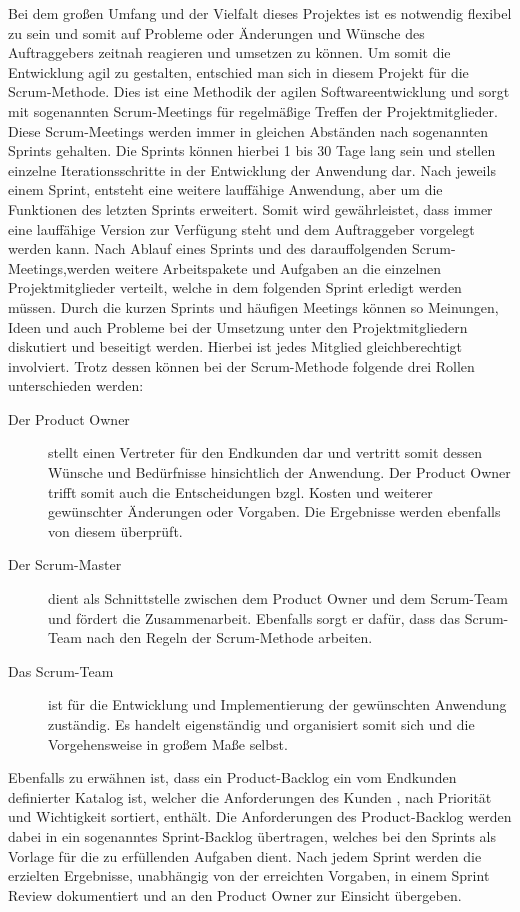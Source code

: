 Bei dem großen Umfang und der Vielfalt dieses Projektes ist es notwendig
flexibel zu sein und somit auf Probleme oder Änderungen und Wünsche des
Auftraggebers zeitnah reagieren und umsetzen zu können. Um somit die
Entwicklung agil zu gestalten, entschied man sich in diesem Projekt für die
Scrum-Methode. Dies ist eine Methodik der agilen Softwareentwicklung und sorgt
mit sogenannten Scrum-Meetings für regelmäßige Treffen der Projektmitglieder.
Diese Scrum-Meetings werden immer in gleichen Abständen nach sogenannten
Sprints gehalten. Die Sprints können hierbei 1 bis 30 Tage lang sein und
stellen einzelne Iterationsschritte in der Entwicklung der Anwendung dar. Nach
jeweils einem Sprint, entsteht eine weitere lauffähige Anwendung, aber um die
Funktionen des letzten Sprints erweitert. Somit wird gewährleistet, dass immer
eine lauffähige Version zur Verfügung steht und dem Auftraggeber vorgelegt
werden kann. Nach Ablauf eines Sprints und des darauffolgenden
Scrum-Meetings,werden weitere Arbeitspakete und Aufgaben an die einzelnen
Projektmitglieder verteilt, welche in dem folgenden Sprint erledigt werden
müssen. Durch die kurzen Sprints und häufigen Meetings können so Meinungen,
Ideen und auch Probleme bei der Umsetzung unter den Projektmitgliedern
diskutiert und beseitigt werden. Hierbei ist jedes Mitglied gleichberechtigt
involviert. Trotz dessen können bei der Scrum-Methode folgende drei Rollen
unterschieden werden:

\begin{description}
\item[Der Product Owner] stellt einen Vertreter für den Endkunden dar und
vertritt somit dessen Wünsche und Bedürfnisse hinsichtlich der Anwendung. Der
Product Owner trifft somit auch die Entscheidungen bzgl. Kosten und weiterer
gewünschter Änderungen oder Vorgaben. Die Ergebnisse werden ebenfalls von
diesem überprüft.
\item[Der Scrum-Master] dient als Schnittstelle zwischen dem Product Owner und
dem Scrum-Team und fördert die Zusammenarbeit. Ebenfalls sorgt er dafür, dass
das Scrum-Team nach den Regeln der Scrum-Methode arbeiten.
\item[Das Scrum-Team] ist für die Entwicklung und Implementierung der
gewünschten Anwendung zuständig. Es handelt eigenständig und organisiert somit
sich und die Vorgehensweise in großem Maße selbst.
\end{description}

Ebenfalls zu erwähnen ist, dass ein Product-Backlog ein vom Endkunden
definierter Katalog ist, welcher die Anforderungen des Kunden , nach Priorität
und Wichtigkeit sortiert, enthält. Die Anforderungen des Product-Backlog werden
dabei in ein sogenanntes Sprint-Backlog übertragen, welches bei den Sprints als
Vorlage für die zu erfüllenden Aufgaben dient. Nach jedem Sprint werden die
erzielten Ergebnisse, unabhängig von der erreichten Vorgaben, in einem Sprint
Review dokumentiert und an den Product Owner zur Einsicht übergeben.

